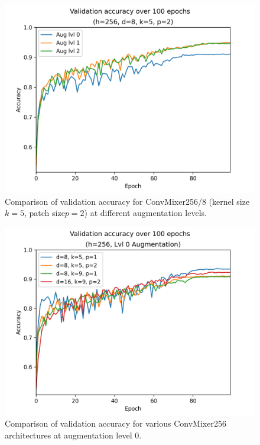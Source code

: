\documentclass[letterpaper]{article} %
\begin{document}
  \begin{figure}
    \includegraphics[width=\linewidth]{val_k5p2.png}
    \caption{Comparison of validation accuracy for ConvMixer256/8 (kernel size $k=5$, patch size$p=2$) at different augmentation levels.}
  \end{figure}

  \begin{figure}
    \includegraphics[width=\linewidth]{val_lvl0.png}
    \caption{Comparison of validation accuracy for various ConvMixer256 architectures at augmentation level 0.}
  \end{figure}

\end{document}
